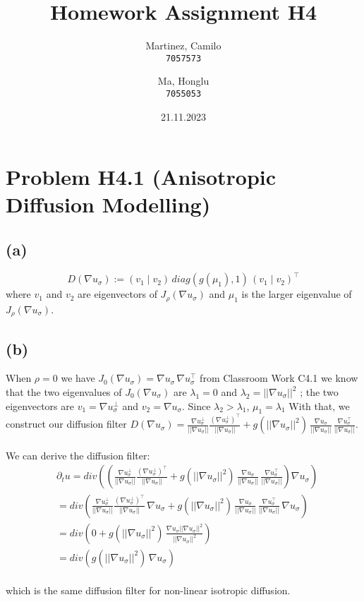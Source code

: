 \documentclass[11pt]{article}
\title{Homework Assignment H4}
\author{Martinez, Camilo\\
	\texttt{7057573}
	\and
	Ma, Honglu\\
	\texttt{7055053}}
\date{21.11.2023}
\begin{document}
\maketitle

\section*{Problem H4.1 (Anisotropic Diffusion Modelling)}
\subsection*{(a)}
$$D(\nabla u_\sigma) :=  (v_1 \mid v_2)\,diag(g(\mu_1), 1)\,(v_1\mid v_2)^\top$$ where $v_1$ and $v_2$ are eigenvectors of $J_\rho(\nabla u_\sigma)$ and $\mu_1$ is the larger eigenvalue of $J_\rho(\nabla u_\sigma)$.
\subsection*{(b)}
When $\rho = 0$ we have $J_0(\nabla u_\sigma) = \nabla u_\sigma\,\nabla u_\sigma^\top$ from Classroom Work C4.1 we know that the two eigenvalues of $J_0(\nabla u_\sigma)$ are $\lambda_1 = 0$ and $\lambda_2 = ||\nabla u_\sigma||^2$ ; the two eigenvectors are $v_1 = \nabla u_\sigma^\perp$ and $v_2 = \nabla u_\sigma$. Since $\lambda_2 > \lambda_1$, $\mu_1 = \lambda_1$ 
With that, we construct our diffusion filter $D(\nabla u_\sigma) = \frac{\nabla u_\sigma^\perp}{||\nabla u_\sigma||}  \frac{(\nabla u_\sigma^\perp)^\top}{||\nabla u_\sigma||} + g(||\nabla u_\sigma||^2)\,\frac{\nabla u_\sigma}{||\nabla u_\sigma||}\,\frac{\nabla u_\sigma^\top}{||\nabla u_\sigma||}$.\\
\\
We can derive the diffusion filter: 
\begin{align}
&\partial_t u = div ((\frac{\nabla u_\sigma^\perp}{||\nabla u_\sigma||}  \frac{(\nabla u_\sigma^\perp)^\top}{||\nabla u_\sigma||} + g(||\nabla u_\sigma||^2)\,\frac{\nabla u_\sigma}{||\nabla u_\sigma||}\,\frac{\nabla u_\sigma^\top}{||\nabla u_\sigma||})\nabla u_\sigma) \\
& = div (\frac{\nabla u_\sigma^\perp}{||\nabla u_\sigma||}  \frac{(\nabla u_\sigma^\perp)^\top}{||\nabla u_\sigma||}\,\nabla u_\sigma +  g(||\nabla u_\sigma||^2)\,\frac{\nabla u_\sigma}{||\nabla u_\sigma||}\,\frac{\nabla u_\sigma^\top}{||\nabla u_\sigma||}\,\nabla u_\sigma) \\
& = div (0 +  g(||\nabla u_\sigma||^2)\,\frac{\nabla u_\sigma ||\nabla u_\sigma||^2}{||\nabla u_\sigma||^2})\\
& = div (g(||\nabla u_\sigma||^2)\,\nabla u_\sigma)
\end{align}\\
which is the same diffusion filter for non-linear isotropic diffusion.
\end{document}
